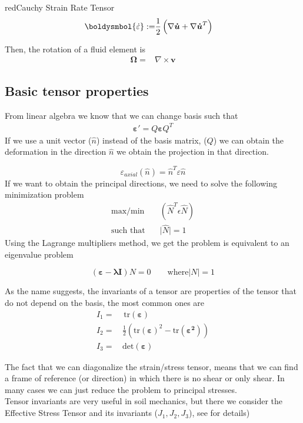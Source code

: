 \documentclass[a4paper, 11pt,article,oneside]{memoir}%
\begin{document}
\begin{eqbox2}{red}{Cauchy Strain Rate Tensor}
\begin{align*}
\boldysmbol{\dot{\varepsilon}}:=&\dfrac{1}{2}\left(\nabla\boldsymbol{\dot{u}}+\nabla\boldsymbol{\dot{u}}^T \right)
\end{align*}
\end{eqbox2}
Then, the rotation of a fluid element is 
\begin{align*}
\boldsymbol{\Omega}=&\nabla \times \boldsymbol{v}
\end{align*}
\subsection{Basic tensor properties}
From linear algebra we know that we can change basis such that
\begin{align*}
\boldsymbol{\varepsilon}'=Q\boldsymbol{\varepsilon}Q^T
\end{align*} 
If we use a unit vector ($\hat{n}$) instead of the basis matrix, ($Q$) we can obtain the deformation in the direction $\hat{n}$ we obtain the projection in that direction.

\begin{equation*}
\varepsilon_{axial}(\hat{n})=\hat{n}^T\varepsilon\hat{n}
\end{equation*}
If we want to obtain the principal directions, we need to solve the following minimization problem 
\begin{align*}
\text{max/min}\quad& (\hat{N}^T\epsilon\hat{N})\\
\text{such that}\quad& \vert\hat{N}\vert=1
\end{align*}
Using the Lagrange multipliers method, we get the problem is equivalent to an eigenvalue problem
\begin{eqbox}
\begin{equation*}
\left(\boldsymbol{\varepsilon-\lambda I} \right)N=0 \qquad \text{where} \vert N\vert=1
\end{equation*}
\end{eqbox}
As the name suggests, the invariants of a tensor are properties of the tensor that do not depend on the basis, the most common ones are
\begin{align*}
I_1 =&\,\text{tr}(\boldsymbol{\varepsilon})\\
I_2=\, &\frac{1}{2}\left(\text{tr}(\boldsymbol{\varepsilon})^2-\text{tr}(\boldsymbol{\varepsilon^2})\right)\\
I_3=\, &\text{det}(\boldsymbol{\varepsilon})
\end{align*}
\begin{note}
The fact that we can diagonalize the strain/stress tensor, means that we can find a frame of reference (or direction) in which there is no shear or only shear. In many cases we can just reduce the problem to principal stresses.\\
Tensor invariants are very useful in soil mechanics, but there we consider the Effective Stress Tensor and its invariants ($J_1,J_2,J_3$), see \cite{ICE2614} for details)
\end{note}
\end{document}

